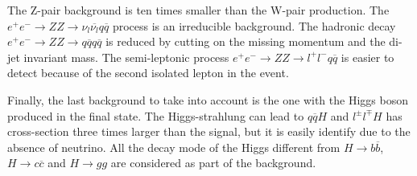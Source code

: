     The Z-pair background is ten times smaller than the W-pair production.
    The  $e^+e^- \rightarrow ZZ \rightarrow \nu_{l}\overline{\nu_{l}}q \overline{q}$ process is an irreducible background.
    The hadronic decay $e^+e^- \rightarrow ZZ \rightarrow q\overline{q} q\overline{q}$ is reduced by cutting on the missing momentum and the di-jet invariant mass.
    The semi-leptonic process $e^+e^- \rightarrow ZZ \rightarrow l^+l^- q\overline{q}$ is easier to detect because of the second isolated lepton in the event.

    Finally, the last background to take into account is the one with the Higgs boson produced in the final state.
    The Higgs-strahlung can lead to $q\overline{q}H$ and $l^{\pm}l^{\mp}H$ has cross-section three times larger than the signal, but it is easily identify due to the absence of neutrino.
    All the decay mode of the Higgs different from $H \rightarrow b\overline{b}$, $H \rightarrow c\overline{c}$ and $H \rightarrow gg$ are considered as part of the background.


